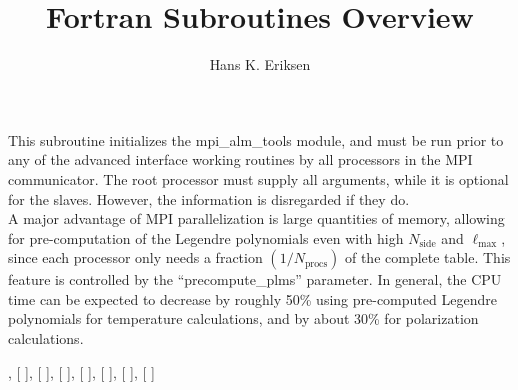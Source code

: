 
\sloppy


\title{\healpix Fortran Subroutines Overview}
 \section[mpi\_initialize\_alm\_tools]{ }
\label{sub:mpi_initialize_alm_tools}
\author{Hans K. Eriksen}

\begin{facility}
{This subroutine initializes the mpi\_alm\_tools module, and must be
run prior to any of the advanced interface working routines by all
processors in the MPI communicator. The root processor must supply all arguments, 
while it is optional for the slaves. However, the information is disregarded 
if they do.\\
A major advantage of MPI parallelization is large quantities
of memory, allowing for pre-computation of the Legendre 
polynomials even with high $N_{\textrm{side}}$ and
$\ell_{\textrm{max}}$, since each processor only needs a fraction
$(1/N_{\textrm{procs}})$ of the complete table. This feature is
controlled by the ``precompute\_plms'' parameter. In general, the CPU
time can be expected to decrease by roughly 50\% using pre-computed
Legendre polynomials for temperature calculations, and by about 30\%
for polarization calculations.
}
{\modMpiAlmTools}
\end{facility}

\begin{f90format}
{%
, [%
], [%
], [%
], [%
], [%
], [%
], [%
]}
\end{f90format}

